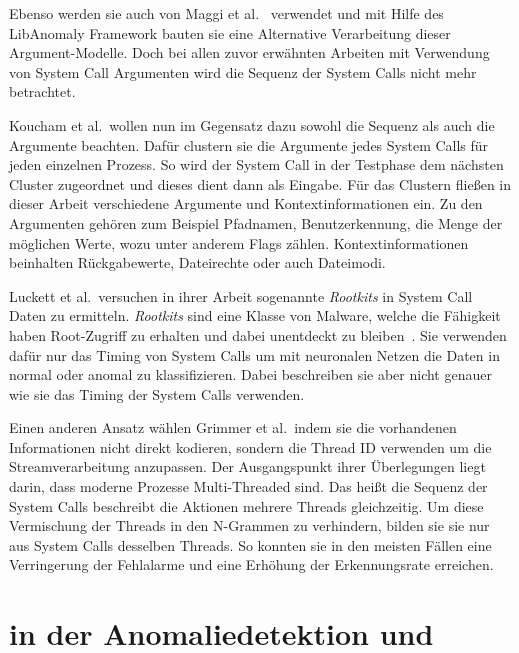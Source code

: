             Ebenso werden sie auch von Maggi et al.~\cite{MAGGI} verwendet und mit Hilfe des LibAnomaly Framework bauten sie eine Alternative Verarbeitung dieser Argument-Modelle.
            Doch bei allen zuvor erwähnten Arbeiten mit Verwendung von System Call Argumenten wird die Sequenz der System Calls nicht mehr betrachtet.

            Koucham et al.\ wollen nun im Gegensatz dazu sowohl die Sequenz als auch die Argumente beachten.
            Dafür clustern sie die Argumente jedes System Calls für jeden einzelnen Prozess.
            So wird der System Call in der Testphase dem nächsten Cluster zugeordnet und dieses dient dann als Eingabe.
            Für das Clustern fließen in dieser Arbeit verschiedene Argumente und Kontextinformationen ein.
            Zu den Argumenten gehören zum Beispiel Pfadnamen, Benutzerkennung, die Menge der möglichen Werte, wozu unter anderem Flags zählen.
            Kontextinformationen beinhalten Rückgabewerte, Dateirechte oder auch Dateimodi.~\cite{ARGUMENTCLUSTERKOUCHAM2015}

            Luckett et al.\ versuchen in ihrer Arbeit sogenannte \textit{Rootkits} in System Call Daten zu ermitteln.
            \textit{Rootkits} sind eine Klasse von Malware, welche die Fähigkeit haben Root-Zugriff zu erhalten und dabei unentdeckt zu bleiben~\cite{OSSECBRAY2008}.
            Sie verwenden dafür nur das Timing von System Calls um mit neuronalen Netzen die Daten in normal oder anomal zu klassifizieren.
            Dabei beschreiben sie aber nicht genauer wie sie das Timing der System Calls verwenden.~\cite{TIMINGLUCKETT2016}

            Einen anderen Ansatz wählen Grimmer et al.\ indem sie die vorhandenen Informationen nicht direkt kodieren, sondern die Thread ID verwenden um die Streamverarbeitung anzupassen.
            Der Ausgangspunkt ihrer Überlegungen liegt darin, dass moderne Prozesse Multi-Threaded sind.
            Das heißt die Sequenz der System Calls beschreibt die Aktionen mehrere Threads gleichzeitig.
            Um diese Vermischung der Threads in den N-Grammen zu verhindern, bilden sie sie nur aus System Calls desselben Threads.
            So konnten sie in den meisten Fällen eine Verringerung der Fehlalarme und eine Erhöhung der Erkennungsrate erreichen.\cite{IDSTHREADGRIMMER2021}

    \section{ in der Anomaliedetektion und }\label{sec:related_nlp}

